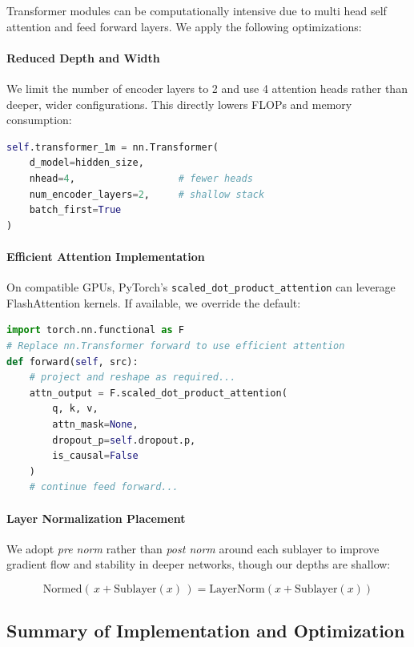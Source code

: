 \documentclass{article}
\begin{document}
Transformer modules can be computationally intensive due to multi head self attention and feed forward layers. We apply the following optimizations:

\paragraph{Reduced Depth and Width}  
We limit the number of encoder layers to 2 and use 4 attention heads rather than deeper, wider configurations. This directly lowers FLOPs and memory consumption:

\begin{lstlisting}[language=Python, caption={Lightweight Transformer Definition}]
self.transformer_1m = nn.Transformer(
    d_model=hidden_size,
    nhead=4,                  # fewer heads
    num_encoder_layers=2,     # shallow stack
    batch_first=True
)
\end{lstlisting}

\paragraph{Efficient Attention Implementation}  
On compatible GPUs, PyTorch’s \texttt{scaled\_dot\_product\_attention} can leverage FlashAttention kernels. If available, we override the default:

\begin{lstlisting}[language=Python, caption={Enable FlashAttention if Supported}]
import torch.nn.functional as F
# Replace nn.Transformer forward to use efficient attention
def forward(self, src):
    # project and reshape as required...
    attn_output = F.scaled_dot_product_attention(
        q, k, v,
        attn_mask=None,
        dropout_p=self.dropout.p,
        is_causal=False
    )
    # continue feed forward...
\end{lstlisting}

\paragraph{Layer Normalization Placement}  
We adopt \emph{pre norm} rather than \emph{post norm} around each sublayer to improve gradient flow and stability in deeper networks, though our depths are shallow:

\[
\text{Normed}(\,x + \text{Sublayer}(x)\,) = \text{LayerNorm}(x + \text{Sublayer}(x))
\]

\subsection{Summary of Implementation and Optimization}
\end{document}

